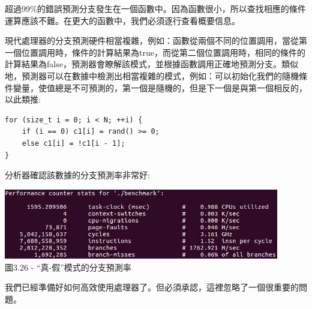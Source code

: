 超過99\%的錯誤預測分支發生在一個函數中。因為函數很小，所以查找相應的條件運算應該不難。在更大的函數中，我們必須逐行查看概要信息。

現代處理器的分支預測硬件相當複雜，例如：函數從兩個不同的位置調用，當從第一個位置調用時，條件的計算結果為true，而從第二個位置調用時，相同的條件的計算結果為false，預測器會瞭解該模式，並根據函數調用正確地預測分支。類似地，預測器可以在數據中檢測出相當複雜的模式，例如：可以初始化我們的隨機條件變量，使值總是不可預測的，第一個是隨機的，但是下一個是與第一個相反的，以此類推:

\begin{lstlisting}[style=styleCXX]
for (size_t i = 0; i < N; ++i) {
	if (i == 0) c1[i] = rand() >= 0;
	else c1[i] = !c1[i - 1];
}
\end{lstlisting}

分析器確認該數據的分支預測率非常好:

\begin{center}
\includegraphics[width=0.9\textwidth]{content/1/chapter3/images/26.jpg}\\
圖3.26 - “真-假”模式的分支預測率
\end{center}

我們已經準備好如何高效使用處理器了。但必須承認，這裡忽略了一個很重要的問題。
































